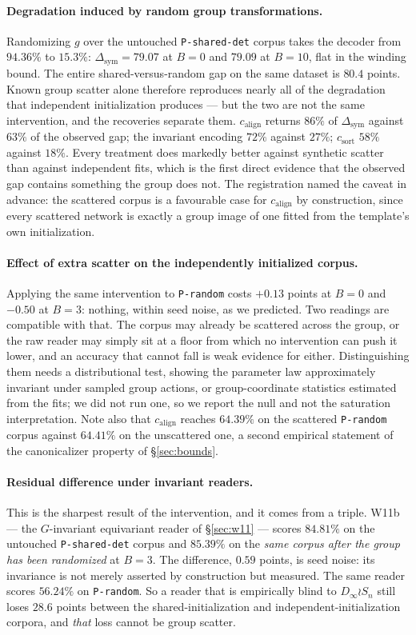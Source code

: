 \documentclass[10pt,twocolumn,letterpaper]{article}
\theoremstyle{definition}
\newcommand{\Dinf}{D_\infty}
\newcommand{\csort}{c_{\mathrm{sort}}}
\newcommand{\calign}{c_{\mathrm{align}}}
\begin{document}
\paragraph{Degradation induced by random group transformations.} Randomizing $g$ over the
untouched \texttt{P-shared-det} corpus takes the decoder from $94.36\%$ to $15.3\%$:
$\Delta_{\mathrm{sym}} = 79.07$ at $B=0$ and $79.09$ at $B=10$, flat in the winding bound. The
entire shared-versus-random gap on the same dataset is $80.4$ points. Known group scatter alone
therefore reproduces nearly all of the degradation that independent initialization produces --- but
the two are not the same intervention, and the recoveries separate them. $\calign$ returns $86\%$ of
$\Delta_{\mathrm{sym}}$ against $63\%$ of the observed gap; the invariant encoding $72\%$ against
$27\%$; $\csort$ $58\%$ against $18\%$. Every treatment does markedly better against synthetic
scatter than against independent fits, which is the first direct evidence that the observed gap
contains something the group does not. The registration named the caveat in advance: the scattered
corpus is a favourable case for $\calign$ by construction, since every scattered network is exactly
a group image of one fitted from the template's own initialization.

\paragraph{Effect of extra scatter on the independently initialized corpus.} Applying the
same intervention to \texttt{P-random} costs $+0.13$ points at $B=0$ and $-0.50$ at $B=3$: nothing,
within seed noise, as we predicted. Two readings are
compatible with that. The corpus may already be scattered across the group, or the raw reader may
simply sit at a floor from which no intervention can push it lower, and an accuracy that cannot
fall is weak evidence for either. Distinguishing them needs a distributional test, showing the
parameter law approximately invariant under sampled group actions, or group-coordinate statistics
estimated from the fits; we did not run one, so we report the null and not the saturation
interpretation. Note also that
$\calign$ reaches $64.39\%$ on the scattered \texttt{P-random} corpus against $64.41\%$ on the
unscattered one, a second empirical statement of the canonicalizer property of \S\ref{sec:bounds}.

\paragraph{Residual difference under invariant readers.} This is the sharpest result of the intervention, and it comes from a triple. W11b --- the
$G$-invariant equivariant reader of \S\ref{sec:w11} --- scores $84.81\%$ on the untouched
\texttt{P-shared-det} corpus and $85.39\%$ on the \emph{same corpus after the group has been
randomized} at $B=3$. The difference, $0.59$ points, is seed noise: its invariance is not merely
asserted by construction but measured. The
same reader scores $56.24\%$ on \texttt{P-random}. So a reader that is empirically blind to
$\Dinf \wr S_n$ still loses $28.6$ points between the shared-initialization and
independent-initialization corpora, and \emph{that} loss cannot be group scatter.
\end{document}
